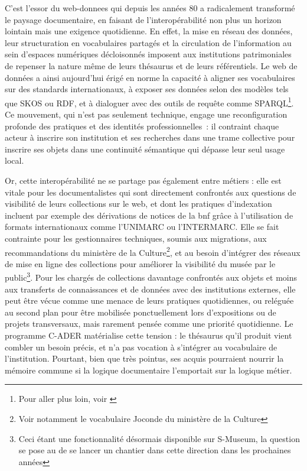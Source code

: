 C'est l'essor du \gls{web-donnees} qui depuis les années 80 a radicalement transformé le paysage documentaire, en faisant de l'interopérabilité non plus un horizon lointain mais une exigence quotidienne. En effet, la mise en réseau des données, leur structuration en vocabulaires partagés et la circulation de l'information au sein d'espaces numériques décloisonnés imposent aux institutions patrimoniales de repenser la nature même de leurs thésaurus et de leurs référentiels. Le web de données a ainsi aujourd'hui érigé en norme la capacité à aligner ses vocabulaires sur des standards internationaux, à exposer ses données selon des modèles tels que SKOS ou RDF, et à dialoguer avec des outils de requête comme SPARQL\footnote{Pour aller plus loin, voir \cite{bermesVersNouveauxCatalogues2016, bermesCasLierDonnees2013a,lenartSKOSLangageRepresentation2007,perrinConsoliderEnrichirSes2020}}. Ce mouvement, qui n'est pas seulement technique, engage une reconfiguration profonde des pratiques et des identités professionnelles : il contraint chaque acteur à inscrire son institution et ses recherches dans une trame collective pour inscrire ses objets dans une continuité sémantique qui dépasse leur seul usage local.

Or, cette interopérabilité ne se partage pas également entre métiers : elle est vitale pour les documentalistes qui sont directement confrontés aux questions de visibilité de leurs collections sur le web, et dont les pratiques d'indexation incluent par exemple des dérivations de notices de la \ac{bnf} grâce à l'utilisation de formats internationaux comme l'UNIMARC ou l'INTERMARC. Elle se fait contrainte pour les gestionnaires techniques, soumis aux migrations, aux recommandations du ministère de la Culture\footnote{Voir notamment le vocabulaire Joconde du ministère de la Culture}, et au besoin d’intégrer des réseaux de mise en ligne des collections pour améliorer la visibilité du musée par le public\footnote{Ceci étant une fonctionnalité désormais disponible sur S-Museum, la question se pose au \mae de se lancer un chantier dans cette direction dans les prochaines années}. Pour les chargés de collections davantage confrontés aux objets et moins aux transferts de connaissances et de données avec des institutions externes, elle peut être vécue comme une menace de leurs pratiques quotidiennes, ou reléguée au second plan pour être mobilisée ponctuellement lors d’expositions ou de projets transversaux, mais rarement pensée comme une priorité quotidienne. Le programme C-ADER matérialise cette tension : le thésaurus qu’il produit vient combler un besoin précis, et n’a pas vocation à s’intégrer au vocabulaire de l'institution. Pourtant, bien que très pointus, ses acquis pourraient nourrir la mémoire commune si la logique documentaire l’emportait sur la logique métier.

